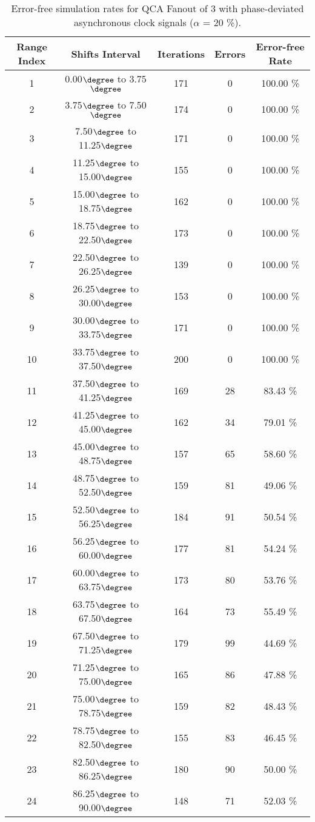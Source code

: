 \flushleft
\begin{table}[h]
\begin{center}
\caption{Error-free simulation rates for QCA Fanout of 3 with phase-deviated asynchronous clock signals ($\alpha$ = 20 \%).}
\begin{tabular}{|c|c|c|c|c|}
\hline
\textbf{Range Index} & \textbf{Shifts Interval} & \textbf{Iterations} & \textbf{Errors} & \textbf{Error-free Rate} \\
\hline
1  &  0.00$\degree$ to  3.75$\degree$ & 171 &  0 & 100.00 \% \\
\hline
2  &  3.75$\degree$ to  7.50$\degree$ & 174 &  0 & 100.00 \% \\
\hline
3  &  7.50$\degree$ to 11.25$\degree$ & 171 &  0 & 100.00 \% \\
\hline
4  & 11.25$\degree$ to 15.00$\degree$ & 155 &  0 & 100.00 \% \\
\hline
5  & 15.00$\degree$ to 18.75$\degree$ & 162 &  0 & 100.00 \% \\
\hline
6  & 18.75$\degree$ to 22.50$\degree$ & 173 &  0 & 100.00 \% \\
\hline
7  & 22.50$\degree$ to 26.25$\degree$ & 139 &  0 & 100.00 \% \\
\hline
8  & 26.25$\degree$ to 30.00$\degree$ & 153 &  0 & 100.00 \% \\
\hline
9  & 30.00$\degree$ to 33.75$\degree$ & 171 &  0 & 100.00 \% \\
\hline
10 & 33.75$\degree$ to 37.50$\degree$ & 200 &  0 & 100.00 \% \\
\hline
11 & 37.50$\degree$ to 41.25$\degree$ & 169 & 28 &  83.43 \% \\
\hline
12 & 41.25$\degree$ to 45.00$\degree$ & 162 & 34 &  79.01 \% \\
\hline
13 & 45.00$\degree$ to 48.75$\degree$ & 157 & 65 &  58.60 \% \\
\hline
14 & 48.75$\degree$ to 52.50$\degree$ & 159 & 81 &  49.06 \% \\
\hline
15 & 52.50$\degree$ to 56.25$\degree$ & 184 & 91 &  50.54 \% \\
\hline
16 & 56.25$\degree$ to 60.00$\degree$ & 177 & 81 &  54.24 \% \\
\hline
17 & 60.00$\degree$ to 63.75$\degree$ & 173 & 80 &  53.76 \% \\
\hline
18 & 63.75$\degree$ to 67.50$\degree$ & 164 & 73 &  55.49 \% \\
\hline
19 & 67.50$\degree$ to 71.25$\degree$ & 179 & 99 &  44.69 \% \\
\hline
20 & 71.25$\degree$ to 75.00$\degree$ & 165 & 86 &  47.88 \% \\
\hline
21 & 75.00$\degree$ to 78.75$\degree$ & 159 & 82 &  48.43 \% \\
\hline
22 & 78.75$\degree$ to 82.50$\degree$ & 155 & 83 &  46.45 \% \\
\hline
23 & 82.50$\degree$ to 86.25$\degree$ & 180 & 90 &  50.00 \% \\
\hline
24 & 86.25$\degree$ to 90.00$\degree$ & 148 & 71 &  52.03 \% \\
\hline


\end{tabular}
\end{center}
\end{table}
